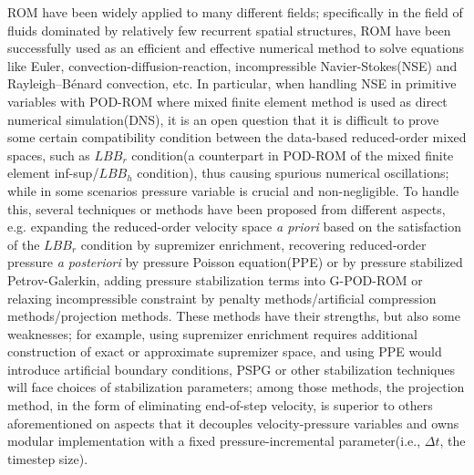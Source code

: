 \documentclass[10pt,twoside,openany,UTF8,CJK]{article}
\begin{document}
	\indent ROM have been widely applied to many different fields; specifically in the field of fluids dominated by relatively few recurrent spatial structures, ROM have been successfully used as an efficient and effective numerical method to solve equations like  Euler\cite{Euler-POD-ROM-2021-JCP}, convection-diffusion-reaction\cite{SUPG-POD-ROM-2022-CMWA}, incompressible Navier-Stokes(NSE)\cite{Luo-POD-NS} and Rayleigh–Bénard convection\cite{RBC-POD-ROM-2019-AMM, RBC-POD-ROM-2020-ICHMT}, etc. In particular, when handling NSE in primitive variables with POD-ROM where mixed finite element method is used as direct numerical simulation(DNS), it is an open question that it is difficult to prove some certain compatibility condition between the data-based reduced-order mixed spaces, such as $LBB_r$ condition(a counterpart in POD-ROM of the mixed finite element inf-sup/$LBB_h$ condition), thus causing spurious numerical oscillations; while in some scenarios pressure variable is crucial and non-negligible\cite{POD-PressurePoissonEquation-JFM-2005}. To handle this, several techniques or methods have been proposed from different aspects, e.g. expanding the reduced-order velocity space \textit{a priori} based on the satisfaction of the $LBB_r$ condition by supremizer enrichment\cite{Supremizer-INFSUP-2013-NM, POD-Supremizer-2015-IJNME}, recovering reduced-order pressure \textit{a posteriori} by pressure Poisson equation(PPE)\cite{PPE-ROM-2009-TCFD, NS-POD-2014-JCP} or by pressure stabilized Petrov-Galerkin\cite{PSPG-POD-ROM-2022-CMAME}, adding pressure stabilization terms into G-POD-ROM\cite{SUPG-POD-ROM-2015-CMAME, VMS-POD-2019-ACM, Ali-PODInfSup-CMWA-2020, POD-LPS-SINUM-2021} or relaxing incompressible constraint by penalty methods/artificial compression methods/projection methods\cite{POD-AC-SINUM-2020, MyFirstPaper}. These methods have their strengths, but also some weaknesses; for example, using supremizer enrichment requires additional construction of exact or approximate supremizer space, and using PPE would introduce artificial boundary conditions, PSPG or other stabilization techniques will face choices of stabilization parameters; among those methods, the projection method, in the form of eliminating end-of-step velocity, is superior to others aforementioned on aspects that it decouples velocity-pressure variables and owns modular implementation with a fixed pressure-incremental parameter(i.e., $\Delta t$, the timestep size).  \\
\end{document}

